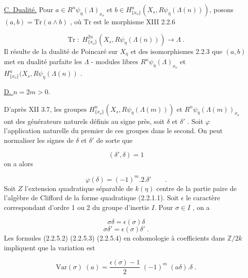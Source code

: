 \underline{C. Dualité.} Pour $a \in R^n\psi_{\overline{\eta}}(\Lambda)_{x_o}$ et $b \in H^n_{\{x_o\}}(X_s,R\psi_{\overline{\eta}}(\Lambda(n)))$, posons $(a,b) = \mathrm{Tr}(a \wedge b)$ , où $\mathrm{Tr}$ est le morphisme XIII 2.2.6

\begin{equation*}
\mathrm{Tr} \; : \; H^{2n}_{\{x_o\}}(X_s,R\psi_{\eta}(\Lambda(n))) \longrightarrow \Lambda \;.
\end{equation*}
Il résulte de la dualité de Poincaré sur $X_{\overline{\eta}}$ et des isomorphismes 2.2.3 que $(a,b)$ met en dualité parfaite les $\Lambda$ - modules libres $R^n\psi_{\overline{\eta}}(\Lambda)_{x_o}$ et $H^n_{\{x_o\}}(X_s,R\psi_{\overline{\eta}}(\Lambda(n))$ .


\underline{D. \quad $n = 2m > 0$}.

D'après XII 3.7, les groupes $H^n_{\{x_o\}}(X_s,R\psi_{\overline{\eta}}(\Lambda(m)))$ et $R^n\psi_{\overline{\eta}}(\Lambda(m))_{x_o}$ ont des générateurs naturels définis au signe près, soit $\delta$ et $\delta'$ . Soit $\varphi$ l'application naturelle du premier de ces groupes dans le second. On peut normaliser les signes de $\delta$ et $\delta'$ de sorte que

\begin{equation}\tag{2.2.5.2}
(\delta',\delta) = 1
\end{equation}
on a alors

\begin{equation}\tag{2.2.5.3}
\varphi(\delta) = (-1)^m . 2 . \delta' \qquad .
\end{equation}
Soit $Z$ l'extension quadratique séparable de $k(\eta)$ centre de la partie paire de l'algèbre de Clifford de la forme quadratique (2.2.1.1). Soit $\epsilon$ le caractère correspondant d'ordre 1 ou 2 du groupe d'inertie $I$. Pour $\sigma \in I$ , on a

\begin{equation}\tag{2.2.5.4}
\sigma\delta = \epsilon(\sigma)\delta
\end{equation}
\begin{equation}\tag{2.2.5.5}
\sigma\delta' = \epsilon(\sigma)\delta' \;.
\end{equation}
Les formules (2.2.5.2) (2.2.5.3) (2.2.5.4) en cohomologie à coefficients dans $\mathbb{Z}/2k$ impliquent que la variation est

\begin{equation}\tag{2.2.5.6}
\mathrm{Var}(\sigma) \; (a) = \frac{\epsilon(\sigma)-1}{2} \; (-1)^m \; (a\delta).\delta \;.
\end{equation}


